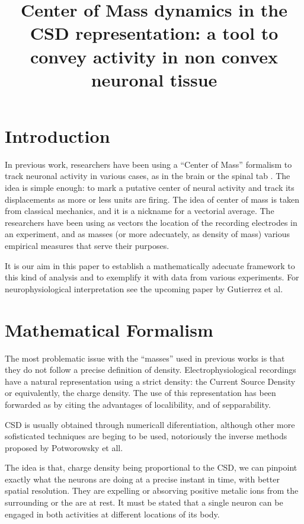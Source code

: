 \documentclass{article}
\title{Center of Mass dynamics in the CSD representation: a tool to convey activity in non convex neuronal tissue}
\begin{document}
\section{Introduction}

In previous work, researchers have been using a ``Center of Mass'' formalism to
track neuronal activity in various cases, as in the brain or the spinal tab
\cite{Manjarrez07, Majarrez09}.
The idea is simple enough: to mark a putative center of neural activity and
track its displacements as more or less units are firing.
The idea of center of mass is taken from classical mechanics, and it is a
nickname for a vectorial average.
The researchers have been using as vectors the location of the recording electrodes in an experiment, and as masses (or more adecuately, as density of mass)
various empirical measures that serve their purposes.

It is our aim in this paper to establish a mathematically adecuate framework
to this kind of analysis and to exemplify it with data from various experiments.
For neurophysiological interpretation see the upcoming paper by Gutierrez et al.


\section{Mathematical Formalism}

The most problematic issue with the ``masses'' used in previous works is
that they do not follow a precise definition of density.
Electrophysiological recordings have a natural representation using
a strict density: the Current Source Density or equivalently, the charge
density. The use of this representation has been forwarded as by
citing the advantages of localibility, and of sepparability.

CSD is usually obtained through numericall diferentiation, although
other more sofisticated techniques are beging to be used, notoriously
the inverse methods proposed by Potworowsky et all.

The idea is that, charge density being proportional to the CSD, we can
pinpoint exactly what the neurons are doing at a precise instant in time,
with better spatial resolution. They are expelling or absorving
positive metalic ions from the surrounding or the are at rest. It must be stated
that a single neuron can be engaged in both activities at different locations
of its body.
\end{document}
